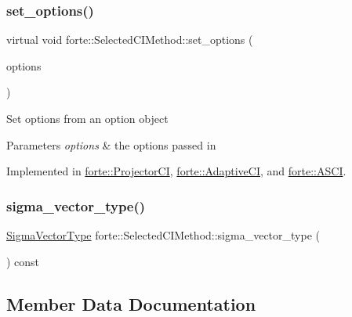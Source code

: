 \subsubsection{\texorpdfstring{set\+\_\+options()}{set\_options()}}
{\footnotesize\ttfamily virtual void forte\+::\+Selected\+C\+I\+Method\+::set\+\_\+options (\begin{DoxyParamCaption}\item[{std\+::shared\+\_\+ptr$<$ \mbox{\hyperlink{classforte_1_1_forte_options}{Forte\+Options}} $>$}]{options }\end{DoxyParamCaption})\hspace{0.3cm}{\ttfamily [pure virtual]}}

Set options from an option object 
\begin{DoxyParams}{Parameters}
{\em options} & the options passed in \\
\hline
\end{DoxyParams}


Implemented in \mbox{\hyperlink{classforte_1_1_projector_c_i_af6605360f58baeccb1877dedcb2ff866}{forte\+::\+Projector\+CI}}, \mbox{\hyperlink{classforte_1_1_adaptive_c_i_a5f23c673c9c66b9b07de115a5992ae3f}{forte\+::\+Adaptive\+CI}}, and \mbox{\hyperlink{classforte_1_1_a_s_c_i_a7b219391b694de5192f5a467f64f60c4}{forte\+::\+A\+S\+CI}}.

\mbox{\label{classforte_1_1_selected_c_i_method_ab4347d6014f0f0407d7844586c965674}} 
\subsubsection{\texorpdfstring{sigma\+\_\+vector\+\_\+type()}{sigma\_vector\_type()}}
{\footnotesize\ttfamily \mbox{\hyperlink{namespaceforte_a94410e08f0cf9a0cfc5e53c70b6bf485}{Sigma\+Vector\+Type}} forte\+::\+Selected\+C\+I\+Method\+::sigma\+\_\+vector\+\_\+type (\begin{DoxyParamCaption}{ }\end{DoxyParamCaption}) const}



\subsection{Member Data Documentation}
\mbox{\label{classforte_1_1_selected_c_i_method_a23a19662f1d8f1c33dbf0892991ece79}} 
